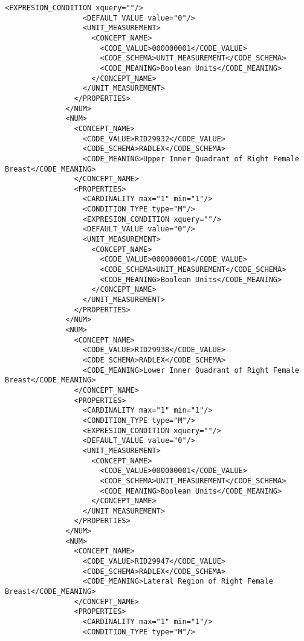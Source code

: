 \begin{lstlisting}[label=dicom-template,caption=Plantilla de un informe estructurado de una exploración de mama]
                  <EXPRESION_CONDITION xquery=""/>
                  <DEFAULT_VALUE value="0"/>
                  <UNIT_MEASUREMENT>
                    <CONCEPT_NAME>
                      <CODE_VALUE>000000001</CODE_VALUE>
                      <CODE_SCHEMA>UNIT_MEASUREMENT</CODE_SCHEMA>
                      <CODE_MEANING>Boolean Units</CODE_MEANING>
                    </CONCEPT_NAME>
                  </UNIT_MEASUREMENT>
                </PROPERTIES>
              </NUM>
              <NUM>
                <CONCEPT_NAME>
                  <CODE_VALUE>RID29932</CODE_VALUE>
                  <CODE_SCHEMA>RADLEX</CODE_SCHEMA>
                  <CODE_MEANING>Upper Inner Quadrant of Right Female Breast</CODE_MEANING>
                </CONCEPT_NAME>
                <PROPERTIES>
                  <CARDINALITY max="1" min="1"/>
                  <CONDITION_TYPE type="M"/>
                  <EXPRESION_CONDITION xquery=""/>
                  <DEFAULT_VALUE value="0"/>
                  <UNIT_MEASUREMENT>
                    <CONCEPT_NAME>
                      <CODE_VALUE>000000001</CODE_VALUE>
                      <CODE_SCHEMA>UNIT_MEASUREMENT</CODE_SCHEMA>
                      <CODE_MEANING>Boolean Units</CODE_MEANING>
                    </CONCEPT_NAME>
                  </UNIT_MEASUREMENT>
                </PROPERTIES>
              </NUM>
              <NUM>
                <CONCEPT_NAME>
                  <CODE_VALUE>RID29938</CODE_VALUE>
                  <CODE_SCHEMA>RADLEX</CODE_SCHEMA>
                  <CODE_MEANING>Lower Inner Quadrant of Right Female Breast</CODE_MEANING>
                </CONCEPT_NAME>
                <PROPERTIES>
                  <CARDINALITY max="1" min="1"/>
                  <CONDITION_TYPE type="M"/>
                  <EXPRESION_CONDITION xquery=""/>
                  <DEFAULT_VALUE value="0"/>
                  <UNIT_MEASUREMENT>
                    <CONCEPT_NAME>
                      <CODE_VALUE>000000001</CODE_VALUE>
                      <CODE_SCHEMA>UNIT_MEASUREMENT</CODE_SCHEMA>
                      <CODE_MEANING>Boolean Units</CODE_MEANING>
                    </CONCEPT_NAME>
                  </UNIT_MEASUREMENT>
                </PROPERTIES>
              </NUM>
              <NUM>
                <CONCEPT_NAME>
                  <CODE_VALUE>RID29947</CODE_VALUE>
                  <CODE_SCHEMA>RADLEX</CODE_SCHEMA>
                  <CODE_MEANING>Lateral Region of Right Female Breast</CODE_MEANING>
                </CONCEPT_NAME>
                <PROPERTIES>
                  <CARDINALITY max="1" min="1"/>
                  <CONDITION_TYPE type="M"/>

\end{lstlisting}
